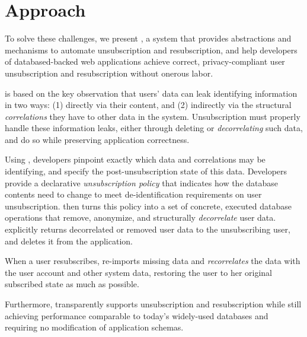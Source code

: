 \section{Approach}
To solve these challenges, we present \sys, a system that provides
abstractions and mechanisms to automate unsubscription and resubscription, and 
help developers of databased-backed web applications achieve correct, privacy-compliant user
unsubscription and resubscription without onerous labor.

\sys is based on the key observation that users' data can leak identifying information in two ways:
(1) directly via their content, and (2) indirectly via the structural \emph{correlations} they have
to other data in the system. 
Unsubscription must properly handle these information leaks, either through deleting or
\emph{decorrelating} such data, and do so while preserving
application correctness.

%
Using \sys, developers pinpoint exactly which data and correlations may be identifying, and
specify the post-unsubscription state of this data. Developers provide a declarative
\emph{unsubscription policy} that indicates how the database contents need to change to meet
de-identification requirements on user unsubscription.
%
\sys then turns this policy into a set of concrete, executed database operations that remove,
anonymize, and structurally \emph{decorrelate} user data. \sys explicitly returns decorrelated or
removed user data to the unsubscribing user, and deletes it from the application.
%

%
When a user resubscribes, \sys re-imports missing data and \emph{recorrelates} the data with the
user account and other system data, restoring the user to her original subscribed state as much as
possible.

Furthermore, \sys transparently supports unsubscription and resubscription while still achieving performance
comparable to today’s widely-used databases and requiring no modification of application schemas.
